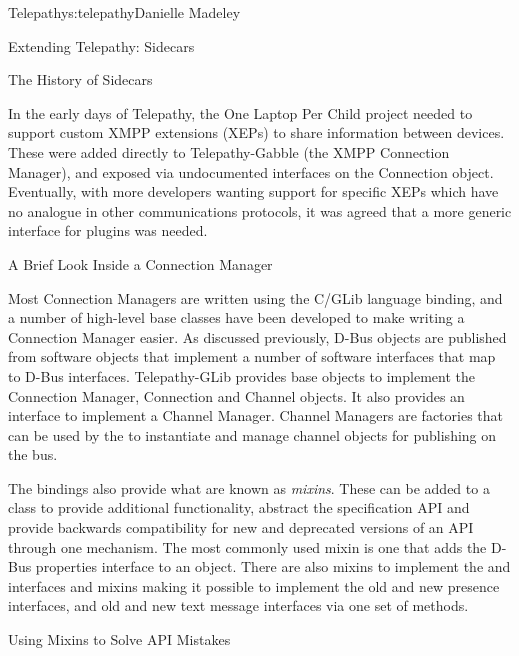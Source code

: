 \begin{aosachapter}{Telepathy}{s:telepathy}{Danielle Madeley}
\begin{aosasect1}{Extending Telepathy: Sidecars}
\begin{aosabox}{The History of Sidecars}

In the early days of Telepathy, the One Laptop Per Child project
needed to support custom XMPP extensions (XEPs) to share information
between devices. These were added directly to Telepathy-Gabble (the
XMPP Connection Manager), and exposed via undocumented interfaces on
the Connection object.  Eventually, with more developers wanting
support for specific XEPs which have no analogue in other
communications protocols, it was agreed that a more generic interface
for plugins was needed.

\end{aosabox}

\end{aosasect1}

\begin{aosasect1}{A Brief Look Inside a Connection Manager}

Most Connection Managers are written using the C/GLib language
binding, and a number of high-level base classes have been developed
to make writing a Connection Manager easier.  As discussed previously,
D-Bus objects are published from software objects that implement a
number of software interfaces that map to D-Bus
interfaces. Telepathy-GLib provides base objects to implement the
Connection Manager, Connection and Channel objects. It also provides
an interface to implement a Channel Manager. Channel Managers are
factories that can be used by the  to instantiate
and manage channel objects for publishing on the bus.

The bindings also provide what are known as \emph{mixins}.  These can
be added to a class to provide additional functionality, abstract the
specification API and provide backwards compatibility for new and
deprecated versions of an API through one mechanism. The most commonly
used mixin is one that adds the D-Bus properties interface to an
object. There are also mixins to implement the
 and
 interfaces and mixins making it
possible to implement the old and new presence interfaces, and old and
new text message interfaces via one set of methods.


\begin{aosabox}{Using Mixins to Solve API Mistakes}


\end{aosabox}
\end{aosasect1}
\end{aosachapter}
